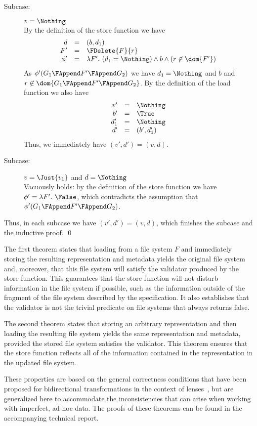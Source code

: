 {\begin{description}
\begin{description}
\item[Subcase:] $v = \Nothing$\\[1ex]
%
By the definition of the store function we have
\[
\begin{array}{rcl}
d  &=& (b,d_1)\\
F' &=& \FDelete{F}{r}\\
\phi' &=& \lambda F'.~(d_1 = \Nothing) \wedge b \wedge (r \not\in \dom{F'})\\
\end{array}
\]
As $\phi'(G_1 \FAppend F' \FAppend G_2)$ we have $d_1 = \Nothing$ and
$b$ and $r \not\in \dom{G_1 \FAppend F' \FAppend G_2}$. By the
definition of the load function we also have
\[
\begin{array}{rcl}
v' &=& \Nothing\\
b' &=& \True\\
d_1' &=& \Nothing\\
d' &=& (b',d_1')
\end{array}
\]
%
Thus, we
immediately have $(v',d') = (v,d)$.
\item[Subcase:] $v = \Just{v_1}$ and $d = \Nothing$\\[1ex]
%
Vacuously holds: by the definition of the store function we have
$\phi' = \lambda F'.~\False$, which contradicts the assumption that
$\phi'(G_1 \FAppend F' \FAppend G_2)$.
\end{description}
Thus, in each subcase we have $(v',d') = (v,d)$, which finishes the
subcase and the inductive proof. \hfill \qed
\end{description}}

\smallskip

\noindent The first theorem states that loading from a file system $F$
and immediately storing the resulting representation and metadata
yields the original file system and, moreover, that this file system
will satisfy the validator produced by the store function. This
guarantees that the store function will not disturb information in the
file system if possible, such as the information outside of the
fragment of the file system described by the specification. It also
establishes that the validator is not the trivial predicate on file
systems that always returns false.

The second theorem states that storing an arbitrary representation and
then loading the resulting file system yields the same representation
and metadata, provided the stored file system satisfies the validator.
This theorem ensures that the store function reflects all of the
information contained in the representation in the updated file
system.

These properties are based on the general correctness conditions that
have been proposed for bidirectional transformations in the context of
lenses~\cite{lenses}, but are generalized here to accommodate the
inconsistencies that can arise when working with imperfect, ad hoc
data. The proofs of these theorems can be found in the accompanying
technical report.

